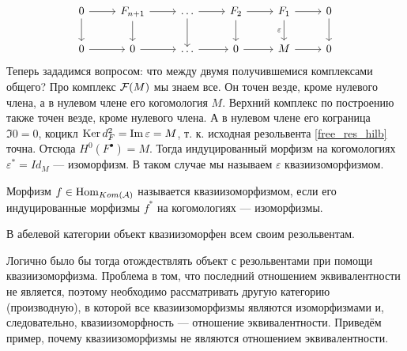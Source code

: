 \documentclass[../main.tex]{subfiles}
\begin{document}
\begin{equation*}
    \begin{tikzcd}
	0 & {F_{n+1}} & \ldots & {F_2} & {F_1} & 0 \\
	0 & 0 & \ldots & 0 & M & 0
	\arrow[from=1-6, to=2-6]
	\arrow["\varepsilon"', from=1-5, to=2-5]
	\arrow[from=1-4, to=2-4]
	\arrow[from=1-3, to=2-3]
	\arrow[from=1-2, to=2-2]
	\arrow[from=1-1, to=2-1]
	\arrow[from=1-1, to=1-2]
	\arrow[from=1-2, to=1-3]
	\arrow[from=1-3, to=1-4]
	\arrow[from=1-4, to=1-5]
	\arrow[from=1-5, to=1-6]
	\arrow[from=2-5, to=2-6]
	\arrow[from=2-4, to=2-5]
	\arrow[from=2-3, to=2-4]
	\arrow[from=2-2, to=2-3]
	\arrow[from=2-1, to=2-2]
\end{tikzcd}
\end{equation*}
Теперь зададимся вопросом: что между двумя получившемися комплексами общего? Про комплекс $\mathcal{F}(M)$ мы знаем все. Он точен везде, кроме нулевого члена, а в нулевом члене его когомология $M$. Верхний комплекс по построению также точен везде, кроме нулевого члена. А в нулевом члене его кограница $\Im 0 = 0$, коцикл $\mathop{\mathrm{Ker}}\nolimits d^2_F = \mathop{\mathrm{Im}}\nolimits \varepsilon = M$, т. к. исходная резольвента \eqref{free_res_hilb} точна. Отсюда $H^0(F^\bullet) = M$. Тогда индуцированный морфизм на когомологиях $\varepsilon^* = Id_M$ --- изоморфизм. В таком случае мы называем $\varepsilon$ квазиизоморфизмом.
\begin{to_def}
Морфизм $f\in \operatorname{Hom}_{Kom(\mathcal{A})}$ называется квазиизоморфизмом, если его индуцированные морфизмы $f^*$ на когомологиях --- изоморфизмы.
\end{to_def}
\begin{to_suj}\label{obj_res_eq}
В абелевой категории объект квазиизоморфен всем своим резольвентам.
\end{to_suj}
Логично было бы тогда отождествлять объект с резольвентами при помощи квазиизоморфизма. Проблема в том, что последний отношением эквивалентности не является, поэтому необходимо рассматривать другую категорию (производную), в которой все квазиизоморфизмы являются изоморфизмами и, следовательно, квазиизоморфность --- отношение эквивалентности.
Приведём пример, почему квазиизоморфизмы не являются отношением эквивалентности.
\end{document}
